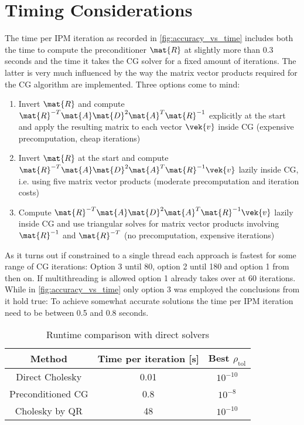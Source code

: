 \section{Timing Considerations}


The time per IPM iteration as recorded in \cref{fig:accuracy_vs_time} includes both the time to compute the preconditioner \(\mat{R}\) at slightly more than 0.3 seconds and the time it takes the CG solver for a fixed amount of iterations.
The latter is very much influenced by the way the matrix vector products required for the CG algorithm are implemented.
Three options come to mind:
\begin{enumerate}
  \item Invert \(\mat{R}\) and compute \(\mat{R}^{-T}\mat{A}\mat{D}^2\mat{A}^T\mat{R}^{-1}\) explicitly at the start and apply the resulting matrix to each vector \(\vek{v}\) inside CG (expensive precomputation, cheap iterations)
  \item Invert \(\mat{R}\) at the start and compute \(\mat{R}^{-T}\mat{A}\mat{D}^2\mat{A}^T\mat{R}^{-1}\vek{v}\) lazily inside CG, i.e. using five matrix vector products (moderate precomputation and iteration costs)
  \item Compute \(\mat{R}^{-T}\mat{A}\mat{D}^2\mat{A}^T\mat{R}^{-1}\vek{v}\) lazily inside CG and use triangular solves for matrix vector products involving \(\mat{R}^{-1}\) and \(\mat{R}^{-T}\) (no precomputation, expensive iterations)
\end{enumerate}
As it turns out if constrained to a single thread each approach is fastest for some range of CG iterations: Option 3 until 80, option 2 until 180 and option 1 from then on.
If multithreading is allowed option 1 already takes over at 60 iterations.
While in \cref{fig:accuracy_vs_time} only option 3 was employed the conclusions from it hold true: To achieve somewhat accurate solutions the time per IPM iteration need to be between 0.5 and 0.8 seconds.

\begin{table}[htbp]
  \centering
  \begin{tabular}{ccc}
    \toprule
    Method & Time per iteration [s] & Best \(\rho_{\mathrm{tol}}\) \\
    \midrule
    Direct Cholesky & 0.01 & \(10^{-10}\) \\
    Preconditioned CG & 0.8 & \(10^{-8}\) \\
    Cholesky by QR & 48 & \(10^{-10}\) \\
    \bottomrule
  \end{tabular}
  \caption{Runtime comparison with direct solvers}
  \label{table:runtime_comparison}
\end{table}

